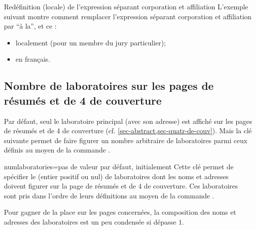 \begin{dbexample}{Redéfinition (locale) de l'expression séparant corporation et
    affiliation}{}
  L'exemple suivant montre comment remplacer l'expression séparant corporation et
  affiliation par \enquote{\textvisiblespace{}à la\textvisiblespace{}}, et ce :
  \begin{itemize}
  \item localement (pour un membre du jury particulier);
  \item en français.
  \end{itemize}
\begin{bodycode}[listing options={showspaces}]
\end{bodycode}
\end{dbexample}

\subsection{Nombre de laboratoires sur les pages de résumés et de 4\ieme{} de couverture}
\label{sec-nombre-de-labor}
%
%

Par défaut, seul le laboratoire principal (avec son adresse) est affiché sur les
pages de résumés et de 4\ieme{} de couverture (cf. \vref{sec-abstract,sec-quatr-de-couv}). Mais la clé
 suivante permet de faire figurer un nombre arbitraire
de laboratoires parmi ceux définis au moyen de la commande .%
%
%

\begin{docKey}{numlaboratories}{=}{pas de valeur par
    défaut, initialement }
  Cette clé permet de spécifier le  (entier positif ou nul) de
  laboratoires dont les noms et adresses doivent figurer sur la page de résumés
  et de 4\ieme{} de couverture. Ces laboratoires sont pris dans l'ordre de
  leurs définitions au moyen de la commande .
\end{docKey}

Pour gagner de la place sur les pages concernées, la composition des noms et
adresses des laboratoires est un peu condensée si  dépasse $1$.

